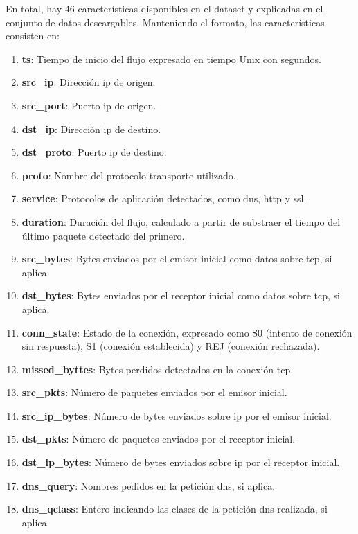 En total, hay 46 características disponibles en el dataset y explicadas en el conjunto de datos descargables. Manteniendo el formato, las características consisten en:

\begin{enumerate}
  \item \textbf{ts}: Tiempo de inicio del flujo expresado en tiempo Unix con segundos.
  \item \textbf{src\_ip}: Dirección \acrshort{ip} de origen.
  \item \textbf{src\_port}: Puerto \acrshort{ip} de origen.
  \item \textbf{dst\_ip}: Dirección \acrshort{ip} de destino.
  \item \textbf{dst\_proto}: Puerto \acrshort{ip} de destino.
  \item \textbf{proto}: Nombre del protocolo transporte utilizado.
  \item \textbf{service}: Protocolos de aplicación detectados, como \acrshort{dns}, \acrshort{http} y \acrshort{ssl}.
  \item \textbf{duration}: Duración del flujo, calculado a partir de substraer el tiempo del último paquete detectado del primero.
  \item \textbf{src\_bytes}: Bytes enviados por el emisor inicial como datos sobre \acrshort{tcp}, si aplica.
  \item \textbf{dst\_bytes}: Bytes enviados por el receptor inicial como datos sobre \acrshort{tcp}, si aplica.
  \item \textbf{conn\_state}: Estado de la conexión, expresado como S0 (intento de conexión sin respuesta), S1 (conexión establecida) y REJ (conexión rechazada).
  \item \textbf{missed\_byttes}: Bytes perdidos detectados en la conexión \acrshort{tcp}.
  \item \textbf{src\_pkts}: Número de paquetes enviados por el emisor inicial.
  \item \textbf{src\_ip\_bytes}: Número de bytes enviados sobre \acrshort{ip} por el emisor inicial.
  \item \textbf{dst\_pkts}: Número de paquetes enviados por el receptor inicial.
  \item \textbf{dst\_ip\_bytes}: Número de bytes enviados sobre \acrshort{ip} por el receptor inicial.
  \item \textbf{dns\_query}: Nombres pedidos en la petición \acrshort{dns}, si aplica.
  \item \textbf{dns\_qclass}: Entero indicando las clases de la petición \acrshort{dns} realizada, si aplica.

\end{enumerate}
